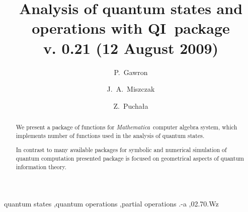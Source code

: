 \documentclass[final,5p,times]{elsarticle}
\newcommand{\Mathematica}{\emph{Mathematica}}
\newcommand{\1}{{\rm 1\hspace{-0.9mm}l}}
\newcommand{\qi}{QI}
\begin{document}
\begin{frontmatter}



\title{Analysis of quantum states and operations with \qi\ package\\[6pt] \small{v. 0.21 (12 August 2009)}}


\author{P.~Gawron}
\author{J.~A.~Miszczak}
\author{Z.~Pucha{\l}a}
\address{Institute of Theoretical and Applied Informatics, Polish Academy of 
Sciences, Ba{\l}tycka 5, 44-100 Gliwice, Poland}

\begin{abstract}
We present a package of functions for \Mathematica\ computer algebra system, 
which implements number of functions used in the analysis of quantum states.

In contrast to many available packages for symbolic and numerical simulation of
quantum computation presented package is focused on geometrical aspects of 
quantum information theory.

\end{abstract}

\begin{keyword}
quantum states \sep quantum operations \sep partial operations
.-a \sep 02.70.Wz


\end{keyword}

\end{frontmatter}
\end{document}
